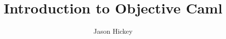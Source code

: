 \documentclass{book}
\title{Introduction to Objective Caml}
\author{Jason Hickey}
\begin{document}
\sloppy
\raggedbottom

\maketitle
\tableofcontents

%
\newif\ifall
\alltrue

\ifall
\fi
\ifall


































\appendix

\fi

%
\sloppy




\printindex
\end{document}
